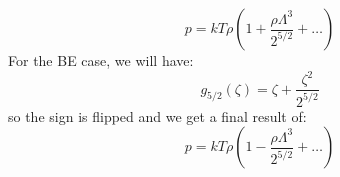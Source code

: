 \documentclass[12pt]{article}
\begin{document}
\begin{equation}
    p = kT\rho\left(1 + \frac{\rho\Lambda^{3}}{2^{5/2}} + \ldots\right)
\end{equation}
For the BE case, we will have:
\begin{equation}
  g_{5 / 2}(\zeta)=\zeta+\frac{\zeta^2}{2^{5 / 2}}
\end{equation}
so the sign is flipped and we get a final result of:
\begin{equation}
    p = kT\rho\left(1 - \frac{\rho\Lambda^{3}}{2^{5/2}} + \ldots\right)
\end{equation}

\end{document}

